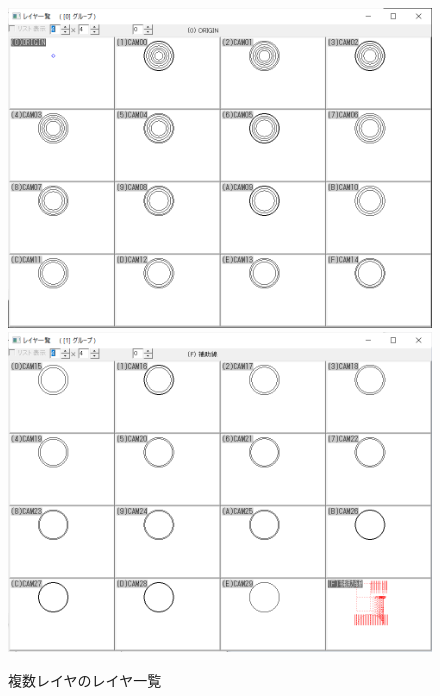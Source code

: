 \begin{figure}[H]
\centering
\includegraphics[scale=0.7]{No3/fig/25d-1.png}\\[2zh]
\includegraphics[scale=0.7]{No3/fig/25d-2.png}
\caption{複数レイヤのレイヤ一覧}
\label{fig:25d-layer.png}
\end{figure}

